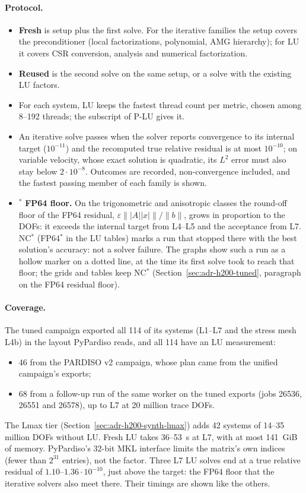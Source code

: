 \paragraph{Protocol.}
\begin{itemize}
\item \textbf{Fresh} is setup plus the first solve. For the iterative families the setup covers
  the preconditioner (local factorizations, polynomial, AMG hierarchy); for LU it covers CSR
  conversion, analysis and numerical factorization.
\item \textbf{Reused} is the second solve on the same setup, or a solve with the existing LU
  factors.
\item For each system, LU keeps the fastest thread count per metric, chosen among 8--192
  threads; the subscript of P-LU gives it.
\item An iterative solve passes when the solver reports convergence to its internal target
  ($10^{-11}$) and the recomputed true relative residual is at most $10^{-10}$; on variable
  velocity, whose exact solution is quadratic, its $L^2$ error must also stay below $2\cdot10^{-8}$.
  Outcomes are recorded, non-convergence included, and the fastest passing member of each family
  is shown.
\item $^*$ \textbf{FP64 floor.} On the trigonometric and anisotropic classes the round-off floor
  of the FP64 residual, $\varepsilon\||A||x|\|/\|b\|$, grows in proportion to the DOFs: it
  exceeds the internal target from L4--L5 and the acceptance from L7. NC$^*$ (FP64$^*$ in the LU
  tables) marks a run that stopped there with the best solution's accuracy: not a solver failure.
  The graphs show such a run as a hollow marker on a dotted line, at the time its first solve took
  to reach that floor; the grids and tables keep NC$^*$ (Section~\ref{sec:adr-h200-tuned},
  paragraph on the FP64 residual floor).
\end{itemize}

\paragraph{Coverage.} The tuned campaign exported all 114 of its systems (L1--L7 and the stress
mesh L4b) in the layout PyPardiso reads, and all 114 have an LU measurement:
\begin{itemize}
\item 46 from the PARDISO v2 campaign, whose plan came from the unified campaign's exports;
\item 68 from a follow-up run of the same worker on the tuned exports (jobs 26536, 26551 and
  26578), up to L7 at 20 million trace DOFs.
\end{itemize}
The Lmax tier (Section~\ref{sec:adr-h200-synth-lmax}) adds 42 systems of 14--35 million
DOFs without LU. Fresh LU takes 36--53~s at L7, with at most 141~GiB of memory. PyPardiso's 32-bit MKL interface
limits the matrix's own indices (fewer than $2^{31}$ entries), not the factor. Three L7 LU solves
end at a true relative residual of $1.10$--$1.36\cdot10^{-10}$, just above the target: the FP64
floor that the iterative solvers also meet there. Their timings are shown like the others.

